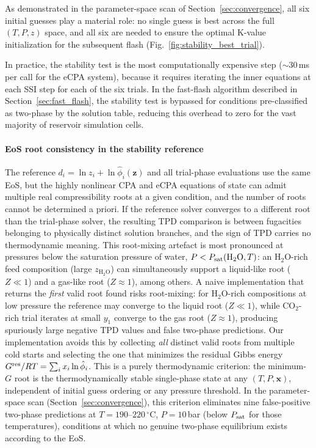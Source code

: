 \documentclass[preprint,12pt,authoryear]{elsarticle}
\begin{document}
As demonstrated in the parameter-space scan of Section~\ref{sec:convergence}, all six
initial guesses play a material role: no single guess is best across the full $(T, P, z)$
space, and all six are needed to ensure the optimal K-value initialization for the
subsequent flash (Fig.~\ref{fig:stability_best_trial}).

In practice, the stability test is the most computationally expensive step ($\sim$30\,ms per
call for the eCPA system), because it requires iterating the inner equations at each SSI step
for each of the six trials.
In the fast-flash algorithm described in Section~\ref{sec:fast_flash}, the stability test is
bypassed for conditions pre-classified as two-phase by the solution table, reducing this
overhead to zero for the vast majority of reservoir simulation cells.

\paragraph{EoS root consistency in the stability reference}
The reference $d_i = \ln z_i + \ln\hat{\phi}_i(\mathbf{z})$ and all trial-phase
evaluations use the same EoS, but the highly nonlinear CPA and eCPA equations of
state can admit multiple real compressibility roots at a given condition, and
the number of roots cannot be determined a priori.
If the reference solver converges to a different root than the trial-phase solver,
the resulting TPD comparison is between fugacities belonging to physically distinct
solution branches, and the sign of TPD carries no thermodynamic meaning.
This root-mixing artefact is most pronounced at pressures below the saturation
pressure of water, $P < P_{\rm sat}(\mathrm{H}_2\mathrm{O},T)$: an H$_2$O-rich
feed composition (large $z_{\mathrm{H}_2\mathrm{O}}$) can simultaneously support
a liquid-like root ($Z \ll 1$) and a gas-like root ($Z \approx 1$), among others.
A naive implementation that returns the \emph{first} valid root found risks
root-mixing: for H$_2$O-rich compositions at low pressure the reference
may converge to the liquid root ($Z \ll 1$), while CO$_2$-rich trial iterates
at small $y_1$ converge to the gas root ($Z \approx 1$), producing
spuriously large negative TPD values and false two-phase predictions.
Our implementation avoids this by collecting \emph{all} distinct valid roots
from multiple cold starts and selecting the one that minimizes the residual
Gibbs energy $G^{\rm res}/RT = \sum_i x_i\ln\hat{\phi}_i$.
This is a purely thermodynamic criterion: the minimum-$G$ root is the
thermodynamically stable single-phase state at any $(T,P,\mathbf{x})$,
independent of initial guess ordering or any pressure threshold.
In the parameter-space scan (Section~\ref{sec:convergence}), this criterion
eliminates nine false-positive two-phase predictions at
$T = 190$--$220\,^\circ$C, $P = 10$\,bar (below $P_{\rm sat}$ for those
temperatures), conditions at which no genuine two-phase equilibrium exists
according to the EoS.
\end{document}
